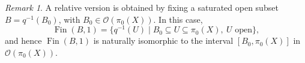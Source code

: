 \documentclass{amsproc}
\theoremstyle{definition}
\theoremstyle{plain}
\theoremstyle{remark}
\newtheorem{remark}[theorem]{Remark}
\numberwithin{equation}{section}
\newcommand{\Cal}[1]{{\mathcal #1}}
\newcommand{\Fin}{\operatorname{Fin}}
\begin{document}
\begin{remark}
A relative version is obtained by fixing a saturated open subset $B=q^{-1}(B_0)$, with $B_0 \in \Cal O (\pi_0(X))$. In this case,
$$
\Fin(B,1)
=
\{q^{-1}(U)\mid B_0\subseteq U\subseteq\pi_0(X),\ U\text{ open}\},
$$
and hence $\Fin(B,1)$ is naturally isomorphic to the interval $[B_0,\pi_0(X)]$ in $\Cal O(\pi_0(X))$.
\end{remark}



\end{document}
